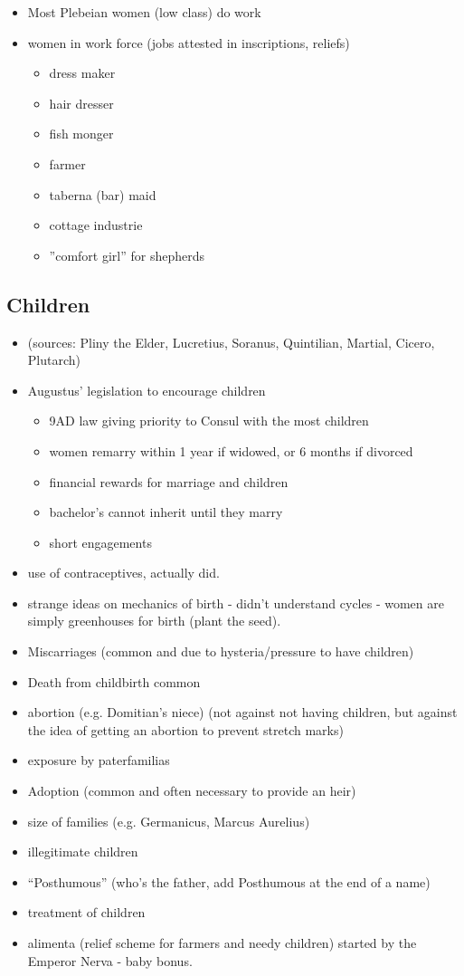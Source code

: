 \documentclass[12pt, twoside]{article}
\begin{document}
\begin{itemize}
\item Most Plebeian women (low class) do work
\item women in work force (jobs attested in inscriptions, reliefs)
	\begin{itemize}
	\item dress maker
	\item hair dresser
	\item fish monger
	\item farmer
	\item taberna (bar) maid
	\item cottage industrie
	\item ”comfort girl” for shepherds
	\end{itemize}
\end{itemize}

\subsection{Children}
\begin{itemize}
\item (sources: Pliny the Elder, Lucretius, Soranus, Quintilian, Martial, Cicero, Plutarch)
\item Augustus' legislation to encourage children
	\begin{itemize}
	\item 9AD law giving priority to Consul with the most children
	\item women remarry within 1 year if widowed, or 6 months if divorced
	\item financial rewards for marriage and children
	\item bachelor’s cannot inherit until they marry
	\item short engagements
	\end{itemize}
\item use of contraceptives, actually did.
\item strange ideas on mechanics of birth - didn't understand cycles - women are simply greenhouses for birth (plant the seed).
\item Miscarriages (common and due to hysteria/pressure to have children)
\item Death from childbirth common
\item abortion (e.g. Domitian's niece) (not against not having children, but against the idea of getting an abortion to prevent stretch marks)
\item exposure by paterfamilias
\item Adoption (common and often necessary to provide an heir)
\item size of families (e.g. Germanicus, Marcus Aurelius)
\item illegitimate children
\item “Posthumous” (who's the father, add Posthumous at the end of a name)
\item treatment of children
\item alimenta (relief scheme for farmers and needy children) started by the Emperor Nerva - baby bonus.
\end{itemize}
\end{document}
